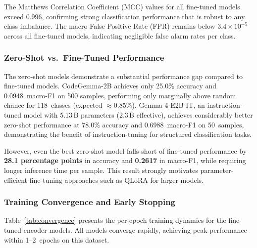 \documentclass[conference]{IEEEtran}
\begin{document}
The Matthews Correlation Coefficient (MCC) values for all fine-tuned models
exceed 0.996, confirming strong classification performance that is robust
to any class imbalance.  The macro False Positive Rate (FPR) remains below
$3.4 \times 10^{-5}$ across all fine-tuned models, indicating negligible
false alarm rates per class.

\subsubsection{Zero-Shot vs.\ Fine-Tuned Performance}
The zero-shot models demonstrate a substantial performance gap compared to
fine-tuned models.  CodeGemma-2B achieves only 25.0\% accuracy and
0.0948~macro-F1 on 500 samples, performing only marginally above random
chance for 118~classes (expected $\approx 0.85\%$).  Gemma-4-E2B-IT, an
instruction-tuned model with 5.13\,B parameters (2.3\,B effective),
achieves considerably better zero-shot performance at 78.0\% accuracy and
0.6988~macro-F1 on 50~samples, demonstrating the benefit of
instruction-tuning for structured classification tasks.

However, even the best zero-shot model falls short of fine-tuned
performance by \textbf{28.1 percentage points} in accuracy and
\textbf{0.2617} in macro-F1, while requiring
longer inference time per sample.
This result strongly motivates parameter-efficient fine-tuning approaches
such as QLoRA for larger models.

\subsubsection{Training Convergence and Early Stopping}
Table~\ref{tab:convergence} presents the per-epoch training dynamics for
the fine-tuned encoder models.  All models converge rapidly, achieving peak
performance within 1--2~epochs on this dataset.
\end{document}
